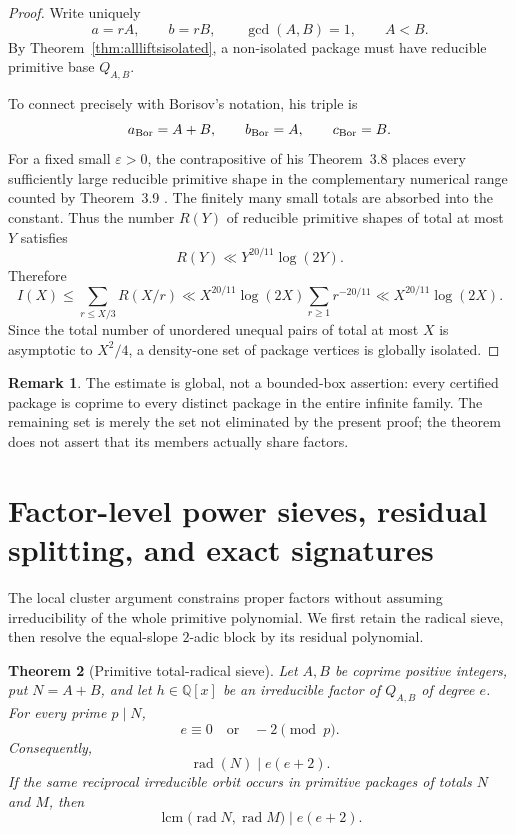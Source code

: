 \documentclass[11pt]{article}
\newtheorem{theorem}{Theorem}[section]
\theoremstyle{definition}
\newtheorem{remark}[theorem]{Remark}
\newcommand{\Q}{\mathbb Q}
\begin{document}
\begin{proof}
Write uniquely
\[
 a=rA,\qquad b=rB,
 \qquad\gcd(A,B)=1,
 \qquad A<B.
\]
By Theorem~\ref{thm:allliftsisolated}, a non-isolated package must have
reducible primitive base \(Q_{A,B}\).

To connect precisely with Borisov's notation, his triple is
\[
 a_{\rm Bor}=A+B,
 \qquad b_{\rm Bor}=A,
 \qquad c_{\rm Bor}=B.
\]
For a fixed small \(\varepsilon>0\), the contrapositive of his
Theorem~3.8 places every sufficiently large reducible primitive shape in the
complementary numerical range counted by Theorem~3.9 \cite{Borisov1998}.  The finitely many
small totals are absorbed into the constant.  Thus the number \(R(Y)\) of
reducible primitive shapes of total at most \(Y\) satisfies
\begin{equation}
 R(Y)\ll Y^{20/11}\log(2Y).
 \tag{14.11}
\end{equation}
Therefore
\[
 I(X)\leq\sum_{r\leq X/3}R(X/r)
 \ll X^{20/11}\log(2X)
 \sum_{r\geq1}r^{-20/11}
 \ll X^{20/11}\log(2X).
\]
Since the total number of unordered unequal pairs of total at most \(X\) is
asymptotic to \(X^2/4\), a density-one set of package vertices is globally
isolated.
\end{proof}

\begin{remark}
The estimate is global, not a bounded-box assertion: every certified package
is coprime to every distinct package in the entire infinite family.  The
remaining set is merely the set not eliminated by the present proof; the
theorem does not assert that its members actually share factors.
\end{remark}

\section{Factor-level power sieves, residual splitting, and exact signatures}
\label{sec:degreesieve}

The local cluster argument constrains proper factors without assuming
irreducibility of the whole primitive polynomial.  We first retain the
radical sieve, then resolve the equal-slope \(2\)-adic block by its residual
polynomial.

\begin{theorem}[Primitive total-radical sieve]
\label{thm:radicalsieve}
Let \(A,B\) be coprime positive integers, put \(N=A+B\), and let
\(h\in\Q[x]\) be an irreducible factor of \(Q_{A,B}\) of degree \(e\).
For every prime \(p\mid N\),
\begin{equation}
 e\equiv0\quad\text{or}\quad-2\pmod p.
 \tag{15.1}
\end{equation}
Consequently,
\begin{equation}
 \operatorname{rad}(N)\mid e(e+2).
 \tag{15.2}
\end{equation}
If the same reciprocal irreducible orbit occurs in primitive packages of
totals \(N\) and \(M\), then
\begin{equation}
 \operatorname{lcm}\bigl(\operatorname{rad}N,
                          \operatorname{rad}M\bigr)
 \mid e(e+2).
 \tag{15.3}
\end{equation}
\end{theorem}
\end{document}
